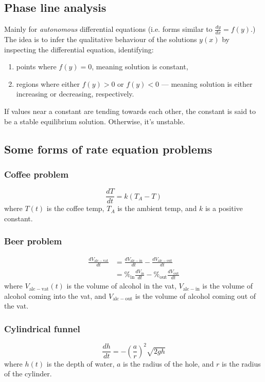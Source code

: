 \documentclass[main.tex]{subfiles}
\begin{document}
	\subsection*{Phase line analysis}
	Mainly for \emph{autonomous} differential equations (i.e. forms similar to \(\frac{dy}{dx} = f(y)\).)
	The idea is to infer the qualitative behaviour of the solutions \(y(x)\) by inspecting the differential equation, identifying:
	\begin{enumerate}
	\item points where \(f(y) = 0\), meaning solution is constant,
	\item regions where either \(f(y) > 0\) or \(f(y) < 0\) --- meaning solution is either increasing or decreasing, respectively.
	\end{enumerate}

	If values near a constant are tending towards each other, the constant is said to be a stable equilibrium solution. Otherwise, it's unstable.

	\subsection*{Some forms of rate equation problems}
	\subsubsection*{Coffee problem}
	\[\frac{dT}{dt} = k(T_A - T)\]
	where \(T(t)\) is the coffee temp, \(T_A\) is the ambient temp, and \(k\) is a positive constant.

	\subsubsection*{Beer problem}
	\begin{align*}
		\frac{dV_\mathrm{alc-vat}}{dt} &= \frac{dV_\mathrm{alc-in}}{dt} - \frac{dV_\mathrm{alc-out}}{dt} \\
		&= \%_\mathrm{in} \frac{dV_\mathrm{in}}{dt} - \%_\mathrm{out} \frac{dV_\mathrm{out}}{dt}
	\end{align*}
	where \(V_\mathrm{alc-vat}(t)\) is the volume of alcohol in the vat, \(V_\mathrm{alc-in}\) is the volume of alcohol coming into the vat, and \(V_\mathrm{alc-out}\) is the volume of alcohol coming out of the vat.

	\subsubsection*{Cylindrical funnel}
	\[\frac{dh}{dt} = - \left(\frac{a}{r}\right)^2 \sqrt{2gh}\]
	where \(h(t)\) is the depth of water, \(a\) is the radius of the hole, and \(r\) is the radius of the cylinder.
\end{document}
